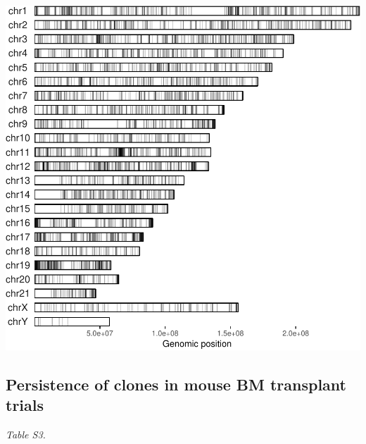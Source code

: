 \documentclass[12pt,]{article}
\begin{document}
\includegraphics{project_files/figure-latex/FigS2-1.pdf}

\newpage

\subsection{Persistence of clones in mouse BM transplant
trials}\label{persistence-of-clones-in-mouse-bm-transplant-trials}

\emph{Table S3.}
\end{document}
